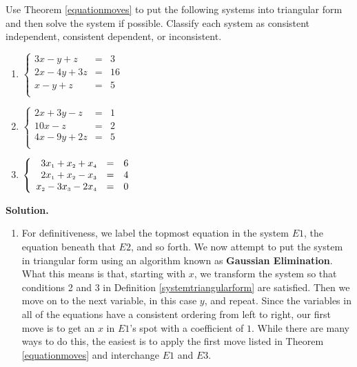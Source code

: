 \begin{ex} \label{GaussEqnEx} Use Theorem \ref{equationmoves} to put the following systems into triangular form and then solve the system if possible.  Classify each system as consistent independent, consistent dependent, or inconsistent.

\begin{multicols}{3}

\begin{enumerate}

\item  $\left\{ \begin{array}{rcr} 3x-y+z & = & 3 \\ 2x-4y+3z & = & 16 \\ x-y+z & = & 5 \\ \end{array} \right.$

\item  $\left\{ \begin{array}{rcr} 2x+3y-z & = & 1 \\ 10x-z & = & 2 \\ 4x-9y+2z & = & 5 \\ \end{array} \right.$

\item  $\left\{ \begin{array}{rcr} 3x_{\mbox{\tiny$1$}} +x_{\mbox{\tiny$2$}} + x_{\mbox{\tiny$4$}} & = & 6 \\ 2x_{\mbox{\tiny$1$}} + x_{\mbox{\tiny$2$}} -x_{\mbox{\tiny$3$}}  & = & 4  \\  x_{\mbox{\tiny$2$}} -3x_{\mbox{\tiny$3$}} -2x_{\mbox{\tiny$4$}} & = & 0 \end{array} \right.$

\end{enumerate}

\end{multicols}

{\bf Solution.}

\begin{enumerate}

\item For definitiveness, we label the topmost equation in the system $E1$, the equation beneath that $E2$, and so forth. We now attempt to put the system in triangular form using an algorithm known as   \textbf{Gaussian Elimination}.  What this means is that, starting with $x$, we transform the system so that conditions 2 and 3 in Definition \ref{systemtriangularform} are satisfied.  Then we move on to the next variable, in this case $y$, and repeat.  Since the variables in all of the equations have a consistent ordering from left to right, our first move is to get an $x$ in $E1$'s spot with a coefficient of $1$.  While there are many ways to do this, the easiest is to apply the first move listed in Theorem \ref{equationmoves} and interchange $E1$ and $E3$.


\end{enumerate}
\end{ex}
